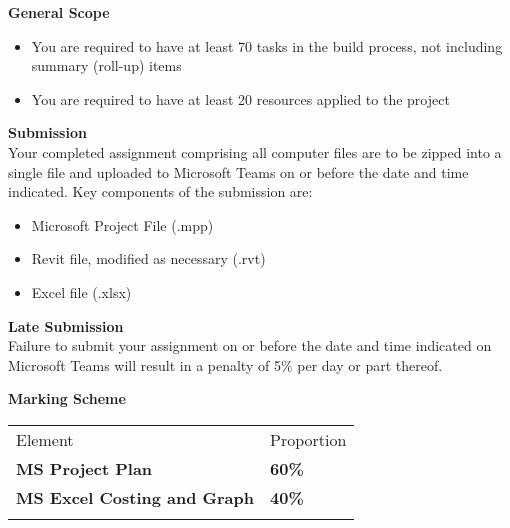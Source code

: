 \textbf{General Scope}

\begin{itemize}
	\item You are required to have at least 70 tasks in the build process, not including summary (roll-up) items
	\item You are required to have at least 20 resources applied to the project
\end{itemize}




\newpage


\textbf{Submission}\\
Your completed assignment comprising all computer files are to be zipped into a single file and uploaded to Microsoft Teams on or before the date and time indicated.  Key components of the submission are:
\begin{itemize}
	\item Microsoft Project File (.mpp)
	\item Revit file, modified as necessary (.rvt)
	\item Excel file (.xlsx)
\end{itemize}




\textbf{Late Submission}\\
Failure to submit your assignment on or before the date and time indicated on Microsoft Teams will result in a penalty of 5\% per day or part thereof.

\vspace{0.5cm}
\textbf{Marking Scheme}

\begin{table}[h!]
     \begin{center}
     \begin{tabular}{p{5cm}  p{5cm} }
     \toprule
      \textbf\large{Element} & \textbf\large{Proportion} \\ 
    \cmidrule(r){1-1}\cmidrule(lr){2-2}
      \textbf{MS Project Plan } & \textbf{60\%}\\
      \textbf{MS Excel Costing and Graph} & \textbf{40\%}\\
      \\ \bottomrule
      \end{tabular}
      \label{tbl:markSchemeAsmt3}
      \end{center}
 \end{table}


